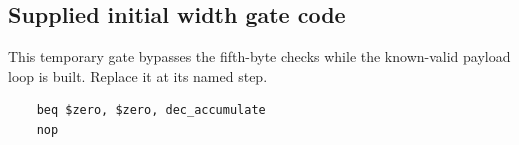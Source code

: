 \subsection*{Supplied initial width gate code}
This temporary gate bypasses the fifth-byte checks while the known-valid payload loop is built. Replace it at its named step.
\begin{verbatim}
    beq $zero, $zero, dec_accumulate
    nop
\end{verbatim}
